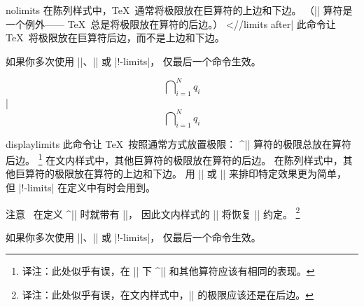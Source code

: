 \begindesc
\cts nolimits {}
\explain
在陈列样式中，\TeX\ 通常将极限放在巨算符的上边和下边。%
（|\int| 算符是一个例外—— \TeX\ 总是将极限放在算符的后边。）%
^^|\int//limits after|
此命令让 \TeX\ 将极限放在巨算符后边，而不是上边和下边。

如果你多次使用 |\limits|、|\nolimits| 或 |\display!-limits|，
仅最后一个命令生效。

\example
$$\bigcap\nolimits_{i=1}^Nq_i$$
|
\dproduces
$$\bigcap\nolimits_{i=1}^Nq_i$$
\endexample
\enddesc

\begindesc
\cts displaylimits {}
\explain
此命令让 \TeX\ 按照通常方式放置极限：
\olist\compact
\li ^|\int| 算符的极限总放在算符后边。%
\footnote{译注：此处似乎有误，在 |\displaylimits| 下 ^|\int| 和其他算符应该有相同的表现。}
\li 在文内样式中，其他巨算符的极限放在算符的后边。
\li 在陈列样式中，其他巨算符的极限放在算符的上边和下边。
\endolist
用 |\limits| 或 |\nolimits| 来排印特定效果更为简单，
但 |\display!-limits| 在定义中有时会用到。

注意 \plainTeX\ 在定义 ^|\int| 时就带有 |\nolimits|，
因此文内样式的 |\int\displaylimits| 将恢复 |\limits| 约定。%
\footnote{译注：此处似乎有误，在文内样式中，|\int\displaylimits| 的极限应该还是在后边。}

如果你多次使用 |\limits|、|\nolimits| 或 |\display!-limits|，
仅最后一个命令生效。

